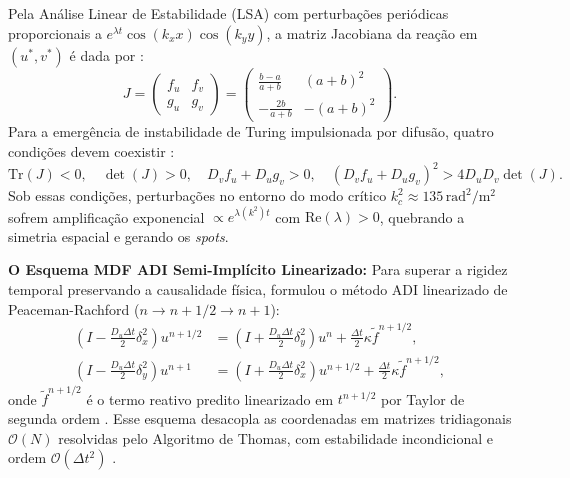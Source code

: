 \documentclass[a4paper, 12pt, twoside]{article}
\begin{document}
Pela Análise Linear de Estabilidade (LSA) com perturbações periódicas proporcionais a $e^{\lambda t} \cos(k_x x) \cos(k_y y)$, a matriz Jacobiana da reação em $(u^*, v^*)$ é dada por \parencite{murray2003mathbio}:
\begin{equation}
  J = \begin{pmatrix} f_u & f_v \\ g_u & g_v \end{pmatrix} = \begin{pmatrix} \frac{b - a}{a + b} & (a + b)^2 \\ -\frac{2b}{a + b} & -(a + b)^2 \end{pmatrix}.
\end{equation}
Para a emergência de instabilidade de Turing impulsionada por difusão, quatro condições devem coexistir \parencite{murray2003mathbio, pereira2019}:
\begin{equation}
  \mathrm{Tr}(J) < 0, \quad \det(J) > 0, \quad D_v f_u + D_u g_v > 0, \quad \left( D_v f_u + D_u g_v \right)^2 > 4 D_u D_v \det(J).
\end{equation}
Sob essas condições, perturbações no entorno do modo crítico $k_c^2 \approx 135\,\text{rad}^2/\text{m}^2$ sofrem amplificação exponencial $\propto e^{\lambda(k^2) t}$ com $\mathrm{Re}(\lambda) > 0$, quebrando a simetria espacial e gerando os \textit{spots}.

\textbf{O Esquema MDF ADI Semi-Implícito Linearizado:} Para superar a rigidez temporal preservando a causalidade física, \textcite{pereira2019} formulou o método ADI linearizado de Peaceman-Rachford ($n \to n+1/2 \to n+1$):
\begin{align}
  \left(I - \tfrac{D_u \Delta t}{2}\delta_x^2\right) u^{n+1/2} &= \left(I + \tfrac{D_u \Delta t}{2}\delta_y^2\right) u^n + \tfrac{\Delta t}{2} \kappa \tilde{f}^{n+1/2}, \label{eq:adi_u} \\
  \left(I - \tfrac{D_u \Delta t}{2}\delta_y^2\right) u^{n+1} &= \left(I + \tfrac{D_u \Delta t}{2}\delta_x^2\right) u^{n+1/2} + \tfrac{\Delta t}{2} \kappa \tilde{f}^{n+1/2}, \label{eq:adi_v}
\end{align}
onde $\tilde{f}^{n+1/2}$ é o termo reativo predito linearizado em $t^{n+1/2}$ por Taylor de segunda ordem \parencite{pereira2019}. Esse esquema desacopla as coordenadas em matrizes tridiagonais $\mathcal{O}(N)$ resolvidas pelo Algoritmo de Thomas, com estabilidade incondicional e ordem $\mathcal{O}(\Delta t^2)$ \parencite{pereira2019}.
\end{document}
